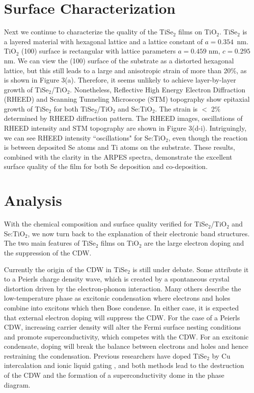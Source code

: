 \documentclass[journal=nalefd,manuscript=letter]{achemso}
\begin{document}
\section{Surface Characterization}
Next we continue to characterize the quality of the TiSe$_2$ films on TiO$_2$.
TiSe$_2$ is a layered material with hexagonal lattice and a lattice constant of $a=0.354 $~nm.
TiO$_2$ (100) surface is rectangular with lattice parameters $a = 0.459$ nm, $c = 0.295$ nm. 
We can view the (100) surface of the substrate as a distorted hexagonal lattice, but this still leads to a large and anisotropic strain of more than 20\%, as is shown in Figure 3(a).
Therefore, it seems unlikely to achieve layer-by-layer growth of TiSe$_2$/TiO$_2$. 
Nonetheless, Reflective High Energy Electron Diffraction (RHEED) and Scanning Tunneling Microscope (STM) topography show epitaxial growth of TiSe$_2$ for both TiSe$_2$/TiO$_2$ and Se:TiO$_2$.
The strain is $<$ 2\% determined by RHEED diffraction pattern. 
The RHEED images, oscillations of RHEED intensity and STM topography are shown in Figure 3(d-i).
Intriguingly, we can see RHEED intensity ``oscillations" for Se:TiO$_2$, even though the reaction is between deposited Se atoms and Ti atoms on the substrate.
These results, combined with the clarity in the ARPES spectra, demonstrate the excellent surface quality of the film for both Se deposition and co-deposition.

\section{Analysis}
With the chemical composition and surface quality verified for TiSe$_2$/TiO$_2$ and Se:TiO$_2$, we now turn back to the explanation of their electronic band structures.
The two main features of TiSe$_2$ films on TiO$_2$ are the large electron doping and the suppression of the CDW.

Currently the origin of the CDW in TiSe$_2$ is still under debate.
Some attribute it to a Peierls charge density wave, which is created by a spontaneous crystal distortion driven by the electron-phonon interaction\cite{Salvo76,Suzuki84SSC}.
Many others describe the low-temperature phase as excitonic condensation where electrons and holes combine into excitons which then Bose condense\cite{Wilson77SSC,Cercellier2007}.
In either case, it is expected that external electron doping will suppress the CDW.
For the case of a Peierls CDW, increasing carrier density will alter the Fermi surface nesting conditions and promote superconductivity, which competes with the CDW.
For an excitonic condensate, doping will break the balance between electrons and holes and hence restraining the condensation.
Previous researchers have doped TiSe$_2$ by Cu intercalation \cite{Morosan2006, ZhaoFeng07prl} and ionic liquid gating \cite{LiNato15nature}, and both methods lead to the destruction of the CDW and the formation of a superconductivity dome in the phase diagram.
\end{document}
